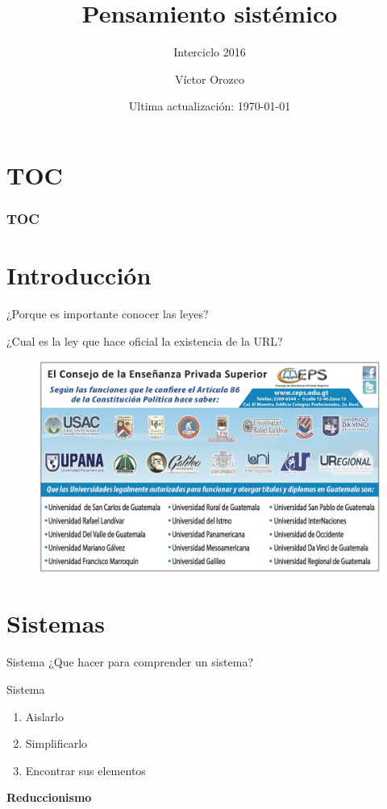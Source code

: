 \documentclass{beamer}
\title{Pensamiento sistémico}
\subtitle{Interciclo 2016}
\date{Ultima actualización: \today}
\author{Víctor Orozco}
\institute{{\Medium Ingeniería} URL}
\begin{document}
\maketitle

\section*{TOC}
\begin{frame}
	\frametitle{TOC}
	\tableofcontents[hideallsubsections]
\end{frame}

\section{Introducción}
\begin{frame}
	¿Porque es importante conocer las leyes? 

	\pause
	¿Cual es la ley que hace oficial la existencia de la URL?
\end{frame}

\begin{frame}
		\begin{figure}
			\centering
			\includegraphics[width=0.9\linewidth]{img/ceps}	
		\end{figure}
\end{frame}

\section{Sistemas}
\begin{frame}{Sistema}
	¿Que hacer para comprender un sistema?
\end{frame}

\begin{frame}{Sistema}
	\begin{enumerate}
		\item Aislarlo 
		\item Simplificarlo
		\item Encontrar sus elementos
	\end{enumerate}
	\pause
	\textbf{Reduccionismo}
\end{frame}
\end{document}
